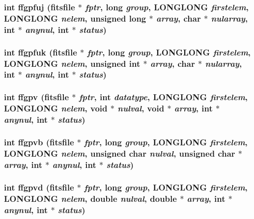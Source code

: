 \subsubsection{\setlength{\rightskip}{0pt plus 5cm}int ffgpfuj (\bf{fitsfile} $\ast$ {\em fptr}, long {\em group}, \bf{LONGLONG} {\em firstelem}, \bf{LONGLONG} {\em nelem}, unsigned long $\ast$ {\em array}, char $\ast$ {\em nularray}, int $\ast$ {\em anynul}, int $\ast$ {\em status})}\label{fitsio_8h_45489521b50ea72a1b13a57a1bdc6180}


\subsubsection{\setlength{\rightskip}{0pt plus 5cm}int ffgpfuk (\bf{fitsfile} $\ast$ {\em fptr}, long {\em group}, \bf{LONGLONG} {\em firstelem}, \bf{LONGLONG} {\em nelem}, unsigned int $\ast$ {\em array}, char $\ast$ {\em nularray}, int $\ast$ {\em anynul}, int $\ast$ {\em status})}\label{fitsio_8h_e184edd1d62907a447c3bce7618b8c57}


\subsubsection{\setlength{\rightskip}{0pt plus 5cm}int ffgpv (\bf{fitsfile} $\ast$ {\em fptr}, int {\em datatype}, \bf{LONGLONG} {\em firstelem}, \bf{LONGLONG} {\em nelem}, void $\ast$ {\em nulval}, void $\ast$ {\em array}, int $\ast$ {\em anynul}, int $\ast$ {\em status})}\label{fitsio_8h_0c3f5323e0fb6305fff345b94fb767e7}


\subsubsection{\setlength{\rightskip}{0pt plus 5cm}int ffgpvb (\bf{fitsfile} $\ast$ {\em fptr}, long {\em group}, \bf{LONGLONG} {\em firstelem}, \bf{LONGLONG} {\em nelem}, unsigned char {\em nulval}, unsigned char $\ast$ {\em array}, int $\ast$ {\em anynul}, int $\ast$ {\em status})}\label{fitsio_8h_8e74e883f394026b322166c514e89737}


\subsubsection{\setlength{\rightskip}{0pt plus 5cm}int ffgpvd (\bf{fitsfile} $\ast$ {\em fptr}, long {\em group}, \bf{LONGLONG} {\em firstelem}, \bf{LONGLONG} {\em nelem}, double {\em nulval}, double $\ast$ {\em array}, int $\ast$ {\em anynul}, int $\ast$ {\em status})}\label{fitsio_8h_360c62c59f25501d54be60fcc9d188a3}


